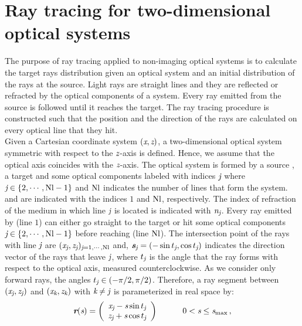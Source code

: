 \section{Ray tracing for two-dimensional optical systems}\label{sec:raytracing}
The purpose of ray tracing applied to non-imaging optical systems is to calculate the target rays distribution given an optical system and an initial distribution of the rays at the source.
Light rays are straight lines and they are reflected or refracted by the optical components of a system.
Every ray emitted from the source is followed until it reaches the target.  
The ray tracing procedure is constructed such that the position and the direction of the rays are calculated on every optical line that they hit. \\ \indent
Given a Cartesian coordinate system $(\textit{x}, \textit{z})$, a two-dimensional optical system symmetric with respect to the $\textit{z}$-axis is defined.
Hence, we assume that the optical axis coincides with the $\textit{z}$-axis.
The optical system is formed by a source , a target   and some optical components labeled with indices $\textit{j}$ where $\textit{j} \in \{2, \cdots, \textrm{Nl}-1\}$ and $\textrm{Nl}$
 indicates the number of lines that form the system.  and  are indicated with the indices $1$ and $\textrm{Nl}$, respectively.
The index of refraction of the medium in which line $\textit{j}$ is located is indicated with $\textit{n}_{\textit{j}}$.
Every ray emitted by  (line $1$) can either go straight to the target  or hit some optical components $\textit{j}\in\{2, \cdots, \textrm{Nl} -1\}$ before reaching  (line $\textrm{Nl}$).
The intersection point of the rays with line $\textit{j}$ are $(\textit{x}_{\textit{j}}, \textit{z}_{\textit{j}})_{\textit{j} =1, \cdots, \textrm{Nl}}$ and, $\textit{\textbf{s}}_{\textit{j}}= (-\sin t_{\textit{j}}, \cos t_{\textit{j}})$ indicates the direction vector of the rays that leave $\textit{j}$,
where $t_{\textit{j}}$ is the angle that the ray forms with respect to the optical axis, measured counterclockwise. As we consider only forward rays, the angles
$t_{\textit{j}}\in (-\pi/2, \pi/2)$.
Therefore, a ray segment between $(\textit{x}_{\textit{j}}, \textit{z}_{\textit{j}})$ and $(\textit{x}_{\textit{k}}, \textit{z}_{\textit{k}})$
with $\textit{k}\neq\textit{j}$ is parameterized in real space by:
\begin{equation}
\label{parametrization}
\textit{\textbf{r}}(\textit{s})=
\left( \begin{array}{cc}
\textit{x}_{\textit{j}}-\textit{s}\sin t_{\textit{j}} \\
\textit{z}_{\textit{j}}+\textit{s}\cos t_{\textit{j}}\end{array} \right) \qquad \quad 0< \textit{s}\leq \textit{s}_{\textrm{max}}\,,
\end{equation}
